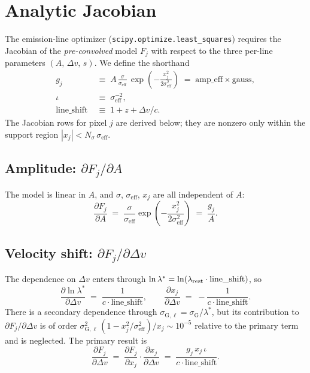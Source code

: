 \documentclass[12pt]{article}
\newcommand{\lstar}{\lambda^{*}}
\newcommand{\sG}{\sigma_{\mathrm{G}}}
\newcommand{\sGl}{\sigma_{\mathrm{G},\ell}}   %
\newcommand{\seff}{\sigma_{\mathrm{eff}}}
\newcommand{\C}{c}                             %
\begin{document}
\section{Analytic Jacobian}
\label{sec:jacobian}

The emission-line optimizer (\texttt{scipy.optimize.least\_squares}) requires
the Jacobian of the \emph{pre-convolved} model $F_j$ with respect to the
three per-line parameters $(A,\, \Delta v,\, s)$.  We define the shorthand
\begin{align}
  g_j &\;\equiv\; A\,\frac{\sigma}{\seff}\,
       \exp\!\left(-\frac{x_j^2}{2\seff^2}\right)
       \;=\; \text{amp\_eff}\times\text{gauss}, \\[4pt]
  \iota &\;\equiv\; \seff^{-2}, \\[4pt]
  \text{line\_shift} &\;\equiv\; 1 + z + \Delta v/\C.
\end{align}
The Jacobian rows for pixel $j$ are derived below; they are nonzero only
within the support region $|x_j| < N_\sigma\,\seff$.

\subsection{Amplitude: \texorpdfstring{$\partial F_j/\partial A$}{dF/dA}}

The model is linear in $A$, and $\sigma$, $\seff$, $x_j$ are all independent
of $A$:
\begin{equation}
  \frac{\partial F_j}{\partial A}
  \;=\; \frac{\sigma}{\seff}
        \exp\!\left(-\frac{x_j^2}{2\seff^2}\right)
  \;=\; \frac{g_j}{A}.
  \label{eq:dF_dA}
\end{equation}

\subsection{Velocity shift: \texorpdfstring{$\partial F_j/\partial \Delta v$}{dF/dv}}
\label{ssec:dFdv}

The dependence on $\Delta v$ enters through $\ln\lstar =
\ln(\lambda_{\rm rest} \cdot \text{line\_shift})$, so
\begin{equation}
  \frac{\partial \ln\lstar}{\partial \Delta v}
  \;=\; \frac{1}{\C\cdot\text{line\_shift}},
  \qquad
  \frac{\partial x_j}{\partial \Delta v}
  \;=\; -\frac{1}{\C\cdot\text{line\_shift}}.
  \label{eq:dlnl_dv}
\end{equation}
There is a secondary dependence through $\sGl = \sG/\lstar$, but its
contribution to $\partial F_j/\partial \Delta v$ is of order
$\sGl^2\,(1-x_j^2/\seff^2)/x_j \sim 10^{-5}$ relative to the primary term
and is neglected.  The primary result is
\begin{equation}
  \frac{\partial F_j}{\partial \Delta v}
  \;=\; \frac{\partial F_j}{\partial x_j}\cdot
        \frac{\partial x_j}{\partial \Delta v}
  \;=\; \frac{g_j\,x_j\,\iota}{\C\cdot\text{line\_shift}}.
  \label{eq:dF_dv}
\end{equation}
\end{document}

